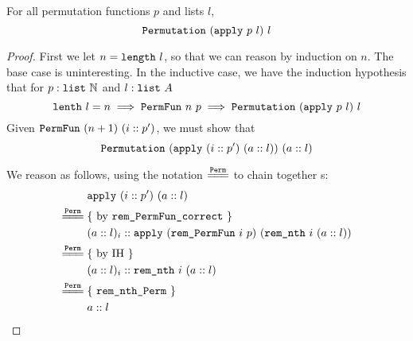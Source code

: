 \documentclass[sigplan,10pt,anonymous,review]{thesis}
\begin{document}
\begin{theorem}
  For all permutation functions $p$ and lists $l$,
  \begin{equation*}
    \texttt{\textup{Permutation}}~(\texttt{\textup{apply}}~p~l)~l
  \end{equation*}
\end{theorem}
\begin{proof}
  First we let $n = \texttt{\textup{length}}~l$, so that we can reason by
  induction on $n$. The base case is uninteresting. In the inductive
  case, we have the induction hypothesis that for $p :
  \texttt{\textup{list}}~\mathbb{N}$ and $l : \texttt{\textup{list}}~A$
  \begin{equation*}
    \texttt{\textup{lenth}}~l = n \implies \texttt{\textup{PermFun}}~n~p \implies
    \texttt{\textup{Permutation}}~(\texttt{\textup{apply}}~p~l)~l
  \end{equation*}
  Given $\texttt{\textup{PermFun}}~(n+1)~(i::p')$, we must show that
  \begin{equation*}
    \texttt{\textup{Permutation}}~(\texttt{\textup{apply}}~(i :: p')~(a :: l))~(a :: l)
  \end{equation*}

  We reason as follows, using the notation $\eqperm$ to
  chain together s:
  \begin{align*}
    &\var{apply}~(i :: p')~(a :: l) \\
    \eqperm{}& \text{\{ by \var{rem\_PermFun\_correct} \}} \\
    &(a :: l)_i :: \var{apply}~(\var{rem\_PermFun}~i~p)~(\var{rem\_nth}~i~(a::l))
    \\
    \eqperm{}& \text{\{ by IH \}} \\
    &(a :: l)_i :: \var{rem\_nth}~i~(a::l)
    \\
    \eqperm{}& \text{\{ \var{rem\_nth\_Perm} \}} \\
    & a :: l \qedhere
  \end{align*}
\end{proof}
\end{document}
